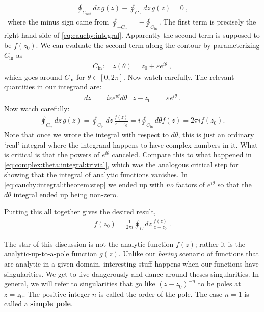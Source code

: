\begin{align}
	\oint_{C_\text{out}} dz\, g(z)
	-
	\oint_{C_\text{in}} dz\, g(z)
	= 0 \ ,
\end{align}\
where the minus sign came from $\oint_{-C_\text{in}} = - \oint_{C_\text{in}}$. The first term is precisely the right-hand side of \eqref{eq:cauchy:integral}. Apparently the second term is supposed to be $f(z_0)$. We can evaluate the second term along the contour by parameterizing $C_\text{in}$ as
\begin{align}
	C_\text{in}: \quad z(\theta) = z_0 + \varepsilon e^{i\theta} \ ,
\end{align}
which goes around $C_\text{in}$ for $\theta \in [0,2\pi]$. Now watch carefully. The relevant quantities in our integrand are:
\begin{align}
	dz &= i\varepsilon e^{i\theta} d\theta 
	&
	z-z_0 &= \varepsilon e^{i\theta} \ .
\end{align}
Now watch carefully: 
\begin{align}
	\oint_{C_\text{in}} dz\, g(z)
	=
	\oint_{C_\text{in}} dz\, \frac{f(z)}{z-z_0}
	= 
	i\oint_{C_\text{in}} d\theta f(z) 
	= 2\pi i f(z_0). 
	\label{eq:cauchy:integral:theorem:step}
\end{align}
Note that once we wrote the integral with respect to $d\theta$, this is just an ordinary `real' integral where the integrand happens to have complex numbers in it. What is critical is that the powers of $e^{i\theta}$ canceled. Compare this to what happened in \eqref{eq:complex:theta:integral:trivial}, which was the analogous critical step for showing that the integral of analytic functions vanishes. In \eqref{eq:cauchy:integral:theorem:step} we ended up with \emph{no} factors of $e^{i\theta}$ so that the $d\theta$ integral ended up being non-zero. 

Putting this all together gives the desired result,
\begin{align}
	f(z_0) = \frac{1}{2\pi i}\oint_C dz\, \frac{f(z)}{z-z_0} \ .
	\label{eq:cauchy:integral:theorem}
\end{align}

The star of this discussion is not the analytic function $f(z)$; rather it is the analytic-up-to-a-pole function $g(z)$. Unlike our \emph{boring} scenario of functions that are analytic in a given domain, interesting stuff happens when our functions have singularities. We get to live dangerously and dance around theses singularities. In general, we will refer to singularities that go like $(z-z_0)^{-n}$ to be poles at $z=z_0$. The positive integer $n$ is called the order of the pole. The case $n=1$ is called a \textbf{simple pole}.

